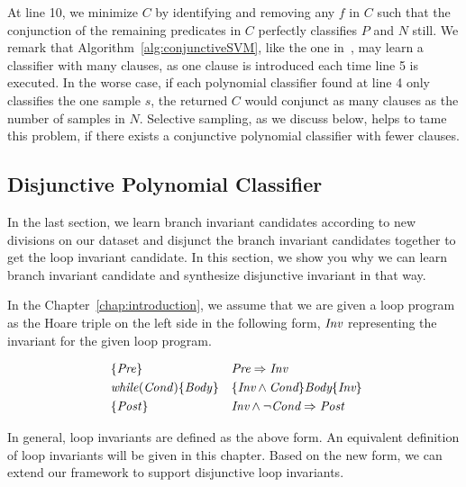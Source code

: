 At line 10, we minimize $C$ by identifying and removing any $f$ in $C$ such that the conjunction of the remaining predicates in $C$ perfectly classifies $P$ and $N$ still. We remark that Algorithm~\ref{alg:conjunctiveSVM}, like the one in~\cite{sharma2012interpolants}, may learn a classifier with many clauses, as one clause is introduced each time line 5 is executed. In the worse case, if each polynomial classifier found at line 4 only classifies the one sample $s$, the returned $C$ would conjunct as many clauses as the number of samples in $N$. Selective sampling, as we discuss below, helps to tame this problem, if there exists a conjunctive polynomial classifier with fewer clauses.



\subsection{Disjunctive Polynomial Classifier}
In the last section, we learn branch invariant candidates according to new divisions on our dataset and
disjunct the branch invariant candidates together to get the loop invariant candidate.
In this section, we show you why we can learn branch invariant candidate and synthesize disjunctive invariant in that way. 

In the Chapter~\ref{chap:introduction}, we assume that we are given a loop program as the Hoare triple on the left side in the following form,
$\emph{Inv}$ representing the invariant for the given loop program.

\begin{align}
&\{\mathit{Pre}\} && \emph{Pre} \Rightarrow \emph{Inv} \label{sl1:org:inv:pre}\\
&\mathit{while} (\mathit{Cond}) \{ \mathit{Body} \} && \{\emph{Inv} \wedge \emph{Cond}\} \emph{Body} \{\emph{Inv}\} \label{sl1:org:inv:loop}\\\
&\{\mathit{Post}\} && \emph{Inv} \wedge \neg \emph{Cond} \Rightarrow \emph{Post} \label{sl1:org:inv:post}
\end{align}

In general, loop invariants are defined as the above form. 
An equivalent definition of loop invariants will be given in this chapter.
Based on the new form, we can extend our framework to support disjunctive loop invariants.

